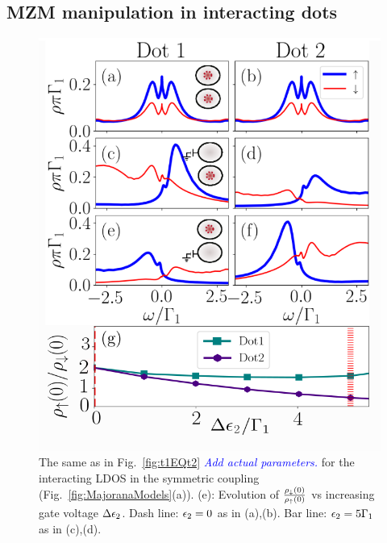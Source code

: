 \documentclass[showpacs,aps,prb,reprint,superscriptaddress]{revtex4-1}
\newcommand{\LUIS}[1]{\textcolor{blue}{\fbox{Luis} {\sl#1}}}
\begin{document}



    \subsection{MZM manipulation in interacting dots \label{subsec:Interacting}}



\begin{figure}[bt]
\begin{center}
\includegraphics[scale=0.45]{Graficos/N2t1=t2.png}
\caption{ \label{fig:Nt1=t2} The same as in Fig.\ \ref{fig:t1EQt2} \LUIS{Add actual parameters.} for the  interacting LDOS in the symmetric coupling (Fig.\ \ref{fig:MajoranaModels}(a)). (e): Evolution of $\frac{\rho_\downarrow(0)}{\rho_\uparrow(0)}$ vs increasing gate voltage $\Delta \epsilon_2$. Dash line: $\epsilon_2 =0$ as in (a),(b). Bar line: $\epsilon_2 =5\Gamma_1$ as in (c),(d).
}
%
\end{center}
\end{figure}
\end{document}
